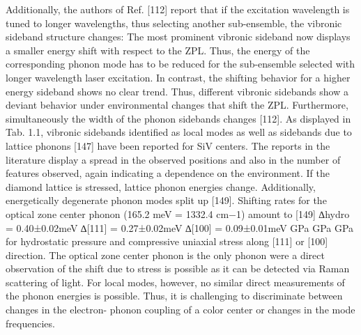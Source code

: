       Additionally, the authors of Ref. [112] report that if the excitation wavelength is tuned to longer wavelengths, thus selecting another sub-ensemble, the vibronic sideband structure changes: The most prominent vibronic sideband now displays a smaller energy shift with respect to the ZPL. Thus, the energy of the corresponding phonon mode has to be reduced for the sub-ensemble selected with longer wavelength laser excitation. In contrast, the shifting behavior for a higher energy sideband shows no clear trend. Thus, different vibronic sidebands show a deviant behavior under environmental changes that shift the ZPL. Furthermore, simultaneously the width of the phonon sidebands changes [112].
      As displayed in Tab. 1.1, vibronic sidebands identified as local modes as well as sidebands due to lattice phonons [147] have been reported for SiV centers. The reports in the literature display a spread in the observed positions and also in the number of features observed, again indicating a dependence on the environment. If the diamond lattice is stressed, lattice phonon energies change. Additionally, energetically degenerate phonon modes split up [149]. Shifting rates for the optical zone center phonon (165.2 meV = 1332.4 cm−1) amount to [149]
      ∆hydro = 0.40±0.02meV ∆[111] = 0.27±0.02meV ∆[100] = 0.09±0.01meV GPa GPa GPa
      for hydrostatic pressure and compressive uniaxial stress along [111] or [100] direction. The optical zone center phonon is the only phonon were a direct observation of the shift due to stress is possible as it can be detected via Raman scattering of light. For local modes, however, no similar direct measurements of the phonon energies is possible. Thus, it is challenging to discriminate between changes in the electron- phonon coupling of a color center or changes in the mode frequencies.
